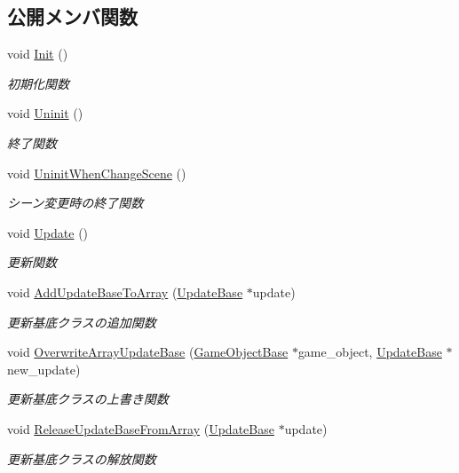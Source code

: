 \subsection*{公開メンバ関数}
\begin{DoxyCompactItemize}
\item 
void \mbox{\hyperlink{class_update_manager_a7b0a2a3bf51d4fcb83fd25fe642fc66b}{Init}} ()
\begin{DoxyCompactList}\small\item\em 初期化関数 \end{DoxyCompactList}\item 
void \mbox{\hyperlink{class_update_manager_a389f9047e882de587eb4def0c691909d}{Uninit}} ()
\begin{DoxyCompactList}\small\item\em 終了関数 \end{DoxyCompactList}\item 
void \mbox{\hyperlink{class_update_manager_a2e0a6b1a620ba620783d929e532b6148}{Uninit\+When\+Change\+Scene}} ()
\begin{DoxyCompactList}\small\item\em シーン変更時の終了関数 \end{DoxyCompactList}\item 
void \mbox{\hyperlink{class_update_manager_ac4bdd39d106c7e6b505fe9a0c55e50de}{Update}} ()
\begin{DoxyCompactList}\small\item\em 更新関数 \end{DoxyCompactList}\item 
void \mbox{\hyperlink{class_update_manager_afe4b39d94cde8294cc273cde32788eaa}{Add\+Update\+Base\+To\+Array}} (\mbox{\hyperlink{class_update_base}{Update\+Base}} $\ast$update)
\begin{DoxyCompactList}\small\item\em 更新基底クラスの追加関数 \end{DoxyCompactList}\item 
void \mbox{\hyperlink{class_update_manager_ab4f492c33ed941ddd01ccae8218080ff}{Overwrite\+Array\+Update\+Base}} (\mbox{\hyperlink{class_game_object_base}{Game\+Object\+Base}} $\ast$game\+\_\+object, \mbox{\hyperlink{class_update_base}{Update\+Base}} $\ast$new\+\_\+update)
\begin{DoxyCompactList}\small\item\em 更新基底クラスの上書き関数 \end{DoxyCompactList}\item 
void \mbox{\hyperlink{class_update_manager_a8a54226896f4280b589af85c07e869d9}{Release\+Update\+Base\+From\+Array}} (\mbox{\hyperlink{class_update_base}{Update\+Base}} $\ast$update)
\begin{DoxyCompactList}\small\item\em 更新基底クラスの解放関数 \end{DoxyCompactList}\end{DoxyCompactItemize}
